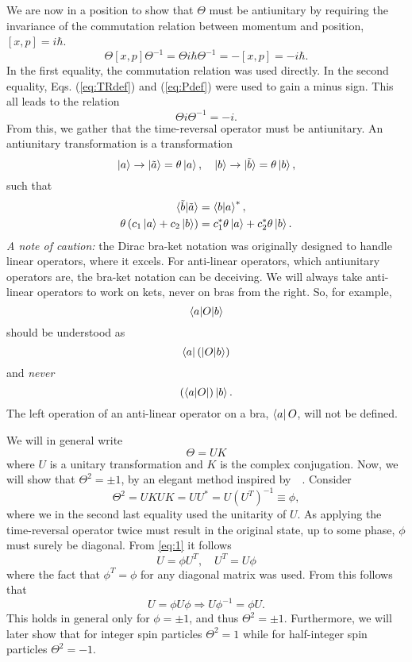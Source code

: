 We are now in a position to show that $\Theta$ must be antiunitary by requiring the invariance of the commutation relation between momentum and position, $[x, p] = i\hbar$.
\begin{equation}
  \Theta [x, p] \Theta^{-1} = \Theta i\hbar \Theta^{-1} = - [x, p] = -i\hbar.
\end{equation}
In the first equality, the commutation relation was used directly.
In the second equality, Eqs. (\ref{eq:TRdef}) and (\ref{eq:Pdef}) were used to gain a minus sign.
This all leads to the relation
\begin{equation}
  \Theta i \Theta^{-1} = -i.
\end{equation}
From this, we gather that the time-reversal operator must be antiunitary.
An antiunitary transformation is a transformation
$$
\ket{a} \rightarrow \ket{\tilde{a}} = \theta \ket{a}, \quad 
\ket{b} \rightarrow \ket{\tilde{b}} = \theta \ket{b},
$$
such that
\begin{align}
  \braket{\tilde{b} | \tilde{a}} &= \braket{b | a}^*,\\
  \theta\left(c_1 \ket{a} + c_2 \ket{b}\right) &= c_1^* \theta\ket{a} + c_2^* \theta\ket{b}.
\end{align}
\emph{A note of caution:} the Dirac bra-ket notation was originally designed to handle linear operators, where it excels.
For anti-linear operators, which antiunitary operators are, the bra-ket notation can be deceiving.
We will always take anti-linear operators to work on kets, never on bras from the right.
So, for example,
$$ \braket{a| O | b} $$
should be understood as
$$ \bra{a} \left(\ket{O |b}\right)$$
and \emph{never}
$$ \left(\bra{a|O}\right) \ket{b}.$$
The left operation of an anti-linear operator on a bra, $\bra{a} O$, will not be defined.

We will in general write
\begin{equation}
  \label{eq:time-rev-def}
  \Theta = U K
\end{equation}
where $U$ is a unitary transformation and $K$ is the complex conjugation.
Now, we will show that $\Theta^2 = \pm 1$, by an elegant method inspired by~\citeauthor{bernevigTopologicalInsulatorsTopological2013}~\cite{bernevigTopologicalInsulatorsTopological2013}.
Consider
\begin{equation}
  \label{eq:1}
  \Theta^2 = UKUK = UU^* = U(U^T)^{-1} \equiv \phi,
\end{equation}
where we in the second last equality used the unitarity of $U$.
As applying the time-reversal operator twice must result in the original state, up to some phase, $\phi$ must surely be diagonal.
From \cref{eq:1} it follows
\begin{equation}
  U = \phi U^T, \quad U^T = U \phi
\end{equation}
where the fact that $\phi^T = \phi$ for any diagonal matrix was used.
From this follows that
\begin{equation}
  U = \phi U \phi \Rightarrow U \phi^{-1} = \phi U.
\end{equation}
This holds in general only for $\phi = \pm 1$, and thus $\Theta^2 = \pm 1$.
Furthermore, we will later show that for integer spin particles $\Theta^2 = 1$ while for half-integer spin particles $\Theta^2 = -1$.

